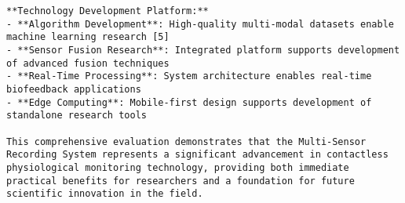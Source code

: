 \begin{verbatim}
**Technology Development Platform:**
- **Algorithm Development**: High-quality multi-modal datasets enable machine learning research [5]
- **Sensor Fusion Research**: Integrated platform supports development of advanced fusion techniques
- **Real-Time Processing**: System architecture enables real-time biofeedback applications
- **Edge Computing**: Mobile-first design supports development of standalone research tools

This comprehensive evaluation demonstrates that the Multi-Sensor Recording System represents a significant advancement in contactless physiological monitoring technology, providing both immediate practical benefits for researchers and a foundation for future scientific innovation in the field.
\end{verbatim}
